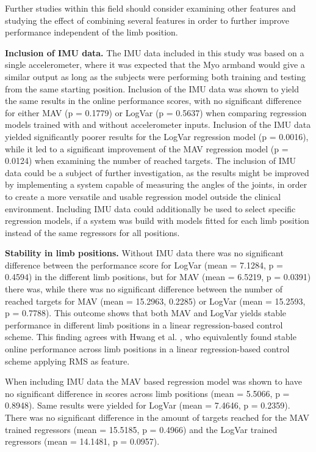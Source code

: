\begin{multicols}{2}
Further studies within this field should consider examining other features and studying the effect of combining several features in order to further improve performance independent of the limb position.

\textbf{Inclusion of IMU data.}
The IMU data included in this study was based on a single accelerometer, where it was expected that the Myo armband would give a similar output as long as the subjects were performing both training and testing from the same starting position. Inclusion of the IMU data was shown to yield the same results in the online performance scores, with no significant difference for either MAV (p = 0.1779) or LogVar (p = 0.5637) when comparing regression models trained with and without accelerometer inputs. Inclusion of the IMU data yielded significantly poorer results for the LogVar regression model (p = 0.0016), while it led to a significant improvement of the MAV regression model (p = 0.0124) when examining the number of reached targets. The inclusion of IMU data could be a subject of further investigation, as the results might be improved by implementing a system capable of measuring the angles of the joints, in order to create a more versatile and usable regression model outside the clinical environment. Including IMU data could additionally be used to select specific regression models, if a system was build with models fitted for each limb position instead of the same regressors for all positions. 

\textbf{Stability in limb positions.}
Without IMU data there was no significant difference between the performance score for LogVar (mean = 7.1284, p = 0.4594)  in the different limb positions, but for MAV (mean = 6.5219, p = 0.0391) there was, while there was no significant difference between the number of reached targets for MAV (mean = 15.2963, 0.2285) or LogVar (mean = 15.2593, p = 0.7788). This outcome shows that both MAV and LogVar yields stable performance in different limb positions in a linear regression-based control scheme. This finding agrees with Hwang et al. \cite{Hwang2017}, who equivalently found stable online performance across limb positions in a linear regression-based control scheme applying RMS as feature.

When including IMU data the MAV based regression model was shown to have no significant difference in scores across limb positions (mean = 5.5066, p = 0.8948). Same results were yielded for LogVar (mean = 7.4646, p = 0.2359).  There was no significant difference in the amount of targets reached for the MAV trained regressors (mean = 15.5185, p = 0.4966) and the LogVar trained regressors (mean = 14.1481, p = 0.0957). 


\end{multicols}
